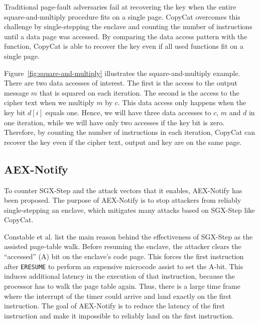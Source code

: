 \documentclass{llncs}
\begin{document}
Traditional page-fault adversaries fail at recovering the key when the entire
square-and-multiply procedure fits on a single page.
CopyCat overcomes this challenge by single-stepping the enclave and counting the
number of instructions until a data page was accessed.
By comparing the data access pattern with the function, CopyCat is able to recover the key
even if all used functions fit on a single page.

Figure~\ref{fig:square-and-multiply} illustrates the square-and-multiply example.
There are two data accesses of interest.
The first is the access to the output message $m$ that is squared on each iteration.
The second is the access to the cipher text when we multiply $m$ by $c$.
This data access only happens when the key bit $d[i]$ equals one.
Hence, we will have three data accesses to $c$, $m$ and $d$ in one iteration,
while we will have only two accesses if the key bit is zero.
Therefore, by counting the number of instructions in each iteration,
CopyCat can recover the key even if the cipher text, output and key are on the same page.


\subsection{AEX-Notify}
\label{sec:aex-notify}

To counter SGX-Step and the attack vectors that it enables, AEX-Notify has been proposed.
The purpose of AEX-Notify is to stop attackers from reliably single-stepping an enclave,
which mitigates many attacks based on SGX-Step like CopyCat.

Constable et al. \cite{ConstableBCXXAK23} list the main reason
behind the effectiveness of SGX-Step as the assisted page-table walk.
Before resuming the enclave, the attacker clears
the ``accessed'' (A) bit on the enclave's code page.
This forces the first instruction after \texttt{ERESUME}
to perform an expensive microcode assist to set the A-bit.
This induces additional latency in the execution of that instruction, because
the processor has to walk the page table again.
Thus, there is a large time frame where the interrupt of the timer could
arrive and land exactly on the first instruction.
The goal of AEX-Notify is to reduce the latency of the first instruction
and make it impossible to reliably land on the first instruction.
\end{document}
